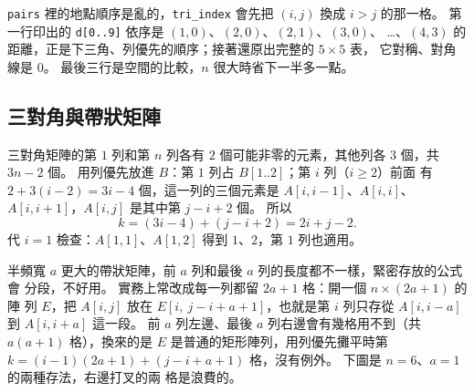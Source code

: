 \texttt{pairs} 裡的地點順序是亂的，\texttt{tri\_index} 會先把 $(i, j)$ 換成 $i > j$
的那一格。 第一行印出的 \texttt{d[0..9]} 依序是 $(1,0)$、$(2,0)$、$(2,1)$、$(3,0)$、
\ldots、$(4,3)$ 的距離，正是下三角、列優先的順序；接著還原出完整的 $5 \times 5$ 表，
它對稱、對角線是 $0$。 最後三行是空間的比較，$n$ 很大時省下一半多一點。

\subsection{三對角與帶狀矩陣}

三對角矩陣的第 $1$ 列和第 $n$ 列各有 $2$ 個可能非零的元素，其他列各 $3$ 個，共
$3n - 2$ 個。 用列優先放進 $B$：第 $1$ 列占 $B[1..2]$；第 $i$ 列（$i \ge 2$）前面
有 $2 + 3(i - 2) = 3i - 4$ 個，這一列的三個元素是 $A[i, i - 1]$、$A[i, i]$、
$A[i, i + 1]$，$A[i, j]$ 是其中第 $j - i + 2$ 個。 所以
\[
k = (3i - 4) + (j - i + 2) = 2i + j - 2 .
\]
代 $i = 1$ 檢查：$A[1, 1]$、$A[1, 2]$ 得到 $1$、$2$，第 $1$ 列也適用。

半頻寬 $a$ 更大的帶狀矩陣，前 $a$ 列和最後 $a$ 列的長度都不一樣，緊密存放的公式會
分段，不好用。 實務上常改成每一列都留 $2a + 1$ 格：開一個 $n \times (2a + 1)$ 的陣
列 $E$，把 $A[i, j]$ 放在 $E[i,\ j - i + a + 1]$，也就是第 $i$ 列只存從 $A[i, i - a]$
到 $A[i, i + a]$ 這一段。 前 $a$ 列左邊、最後 $a$ 列右邊會有幾格用不到（共
$a(a + 1)$ 格），換來的是 $E$ 是普通的矩形陣列，用列優先攤平時第 $k = (i - 1)(2a + 1)
+ (j - i + a + 1)$ 格，沒有例外。 下圖是 $n = 6$、$a = 1$ 的兩種存法，右邊打叉的兩
格是浪費的。

